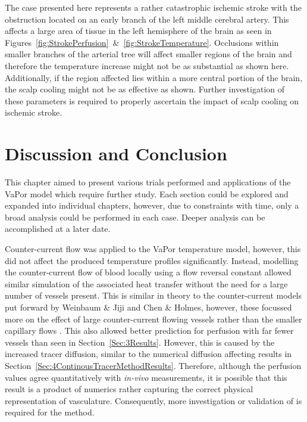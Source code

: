 \documentclass[11pt,english,a4paper,twoside,openright]{report}
\begin{document}
{{{{{{{The case presented here represents a rather catastrophic ischemic stroke with the obstruction located on an early branch of the left middle cerebral artery. This affects a large area of tissue in the left hemisphere of the brain as seen in Figures~\ref{fig:StrokePerfusion}~\&~\ref{fig:StrokeTemperature}. Occlusions within smaller branches of the arterial tree will affect smaller regions of the brain and therefore the temperature increase might not be as substantial as shown here. Additionally, if the region affected lies within a more central portion of the brain, the scalp cooling might not be as effective as shown. Further investigation of these parameters is required to properly ascertain the impact of scalp cooling on ischemic stroke.

\section[Discussion and Conclusion]{{\Large D}iscussion and {\Large C}onclusion}

This chapter aimed to present various trials performed and applications of the VaPor model which require further study. Each section could be explored and expanded into individual chapters, however, due to constraints with time, only a broad analysis could be performed in each case. Deeper analysis can be accomplished at a later date.

Counter-current flow was applied to the VaPor temperature model, however, this did not affect the produced temperature profiles significantly. Instead, modelling the counter-current flow of blood locally using a flow reversal constant allowed similar simulation of the associated heat transfer without the need for a large number of vessels present. This is similar in theory to the counter-current models put forward by Weinbaum \& Jiji and Chen \& Holmes, however, these focussed more on the effect of large counter-current flowing vessels rather than the smaller capillary flows \cite{chen1980microvascular}\cite{weinbaum1985new}. This also allowed better prediction for perfusion with far fewer vessels than seen in Section~\ref{Sec:3Results}. However, this is caused by the increased tracer diffusion, similar to the numerical diffusion affecting results in Section~\ref{Sec:4ContinousTracerMethodResults}. Therefore, although the perfusion values agree quantitatively with \textit{in-vivo} measurements, it is possible that this result is a product of numerics rather capturing the correct physical representation of vasculature. Consequently, more investigation or validation of is required for the method.

}}}}}}}
\end{document}
